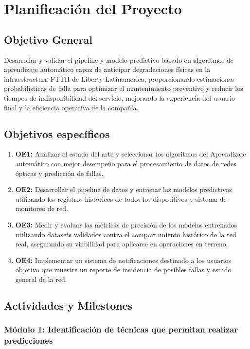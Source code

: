 \documentclass[12pt,a4paper]{article}
\begin{document}
    \section{Planificación del Proyecto}
    \subsection{Objetivo General}
    \noindent
    Desarrollar y validar el pipeline y modelo predictivo basado en algoritmos de aprendizaje automático capaz de anticipar degradaciones físicas en la infraestructura FTTH de Liberty Latinamerica, proporcionando estimaciones probabilísticas
    de falla para optimizar el mantenimiento preventivo y reducir los tiempos de indisponibilidad del servicio, mejorando la experiencia del usuario final y la eficiencia operativa de la compañía.

    \subsection{Objetivos específicos}
    \begin{enumerate}
        \item \textbf{OE1:} Analizar el estado del arte y seleccionar los algoritmos del Aprendizaje automático con mejor desempeño para el procesamiento de datos de redes ópticas y predicción de fallas.
        \item \textbf{OE2:} Desarrollar el pipeline de datos y entrenar los modelos predictivos utilizando los registros históricos de todos los dispositivos y sistema de monitoreo de red.
        \item \textbf{OE3:} Medir y evaluar las métricas de precisión de los modelos entrenados utilizando datasets validados contra el comportamiento histórico de la red real, asegurando su viabilidad para aplicarse en operaciones en terreno.
        \item \textbf{OE4:} Implementar un sistema de notificaciones destinado a los usuarios objetivo que muestre un reporte de incidencia de posibles fallas y estado general de la red.
    \end{enumerate}

    \subsection{Actividades y Milestones}
    \noindent
    

    \subsubsection{Módulo 1: Identificación de técnicas que permitan realizar predicciones}
\end{document}
